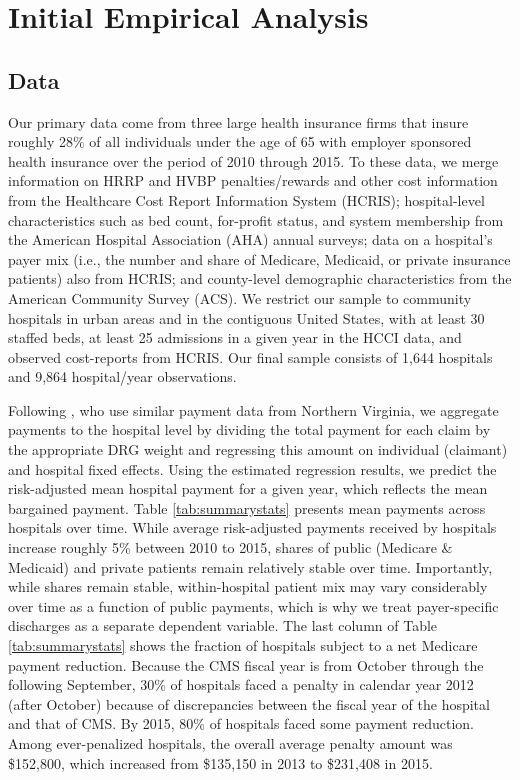 \documentclass[12pt]{article}
\begin{document}
\section{Initial Empirical Analysis}
\label{sec:Empirical}


\subsection{Data}
Our primary data come from three large health insurance firms that insure roughly 28$\%$ of all individuals under the age of 65 with employer sponsored health insurance over the period of 2010 through 2015.  To these data, we merge information on HRRP and HVBP penalties/rewards and other cost information from the Healthcare Cost Report Information System (HCRIS); hospital-level characteristics such as bed count, for-profit status, and system membership from the American Hospital Association (AHA) annual surveys; data on a hospital's payer mix (i.e., the number and share of Medicare, Medicaid, or private insurance patients) also from HCRIS; and county-level demographic characteristics from the American Community Survey (ACS).  We restrict our sample to community hospitals in urban areas and in the contiguous United States, with at least 30 staffed beds, at least 25 admissions in a given year in the HCCI data, and observed cost-reports from HCRIS.  Our final sample consists of 1,644 hospitals and 9,864 hospital/year observations.

Following \citet{gowrisankaran2015}, who use similar payment data from Northern Virginia, we aggregate payments to the hospital level by dividing the total payment for each claim by the appropriate DRG weight and regressing this amount on individual (claimant) and hospital fixed effects.  Using the estimated regression results, we predict the risk-adjusted mean hospital payment for a given year, which reflects the mean bargained payment. Table \ref{tab:summarystats} presents mean payments across hospitals over time. While average risk-adjusted payments received by hospitals increase roughly 5$\%$ between 2010 to 2015, shares of public (Medicare \& Medicaid) and private patients remain relatively stable over time.  Importantly, while shares remain stable, within-hospital patient mix may vary considerably over time as a function of public payments, which is why we treat payer-specific discharges as a separate dependent variable.  The last column of Table \ref{tab:summarystats} shows the fraction of hospitals subject to a net Medicare payment reduction.  Because the CMS fiscal year is from October through the following September, 30$\%$ of hospitals faced a penalty in calendar year 2012 (after October) because of discrepancies between the fiscal year of the hospital and that of CMS.  By 2015, 80$\%$ of hospitals faced some payment reduction. Among ever-penalized hospitals, the overall average penalty amount was \$152,800, which increased from \$135,150 in 2013 to \$231,408 in 2015.
\end{document}
